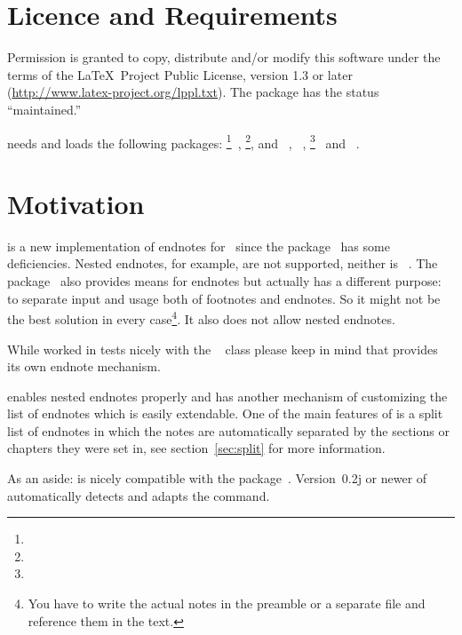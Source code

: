 \documentclass[toc=bib,toc=index]{cnpkgdoc}
\begin{document}
\section{Licence and Requirements}
Permission is granted to copy, distribute and/or modify this software under
the terms of the \LaTeX\ Project Public License, version 1.3 or later
(\url{http://www.latex-project.org/lppl.txt}).  The package has the status
``maintained.''

\enotez needs and loads the following packages:
\footnote{}~\cite{pkg:l3kernel},
\footnote{},  and
~\cite{pkg:l3packages}, ~\cite{pkg:xpatch},
\footnote{}~\cite{pkg:scrlfile} and
~\cite{pkg:translations}.


\section{Motivation}
\enotez is a new implementation of endnotes for \LaTeXe\ since the
 package~\cite{pkg:endnotes} has some deficiencies.  Nested
endnotes, for example, are not supported, neither is
~\cite{pkg:hyperref}.  The 
package~\cite{pkg:sepfootnotes} also provides means for endnotes but actually
has a different purpose: to separate input and usage both of footnotes and
endnotes.  So it might not be the best solution in every case\footnote{You
  have to write the actual notes in the preamble or a separate file and
  reference them in the text.}.  It also does not allow nested endnotes.

While \enotez worked in tests nicely with the
~\cite{cls:memoir} class please keep in mind that
 provides its own endnote mechanism.

\enotez enables nested endnotes properly and has another mechanism of
customizing the list of endnotes which is easily extendable.  One of the main
features of \enotez is a split list of endnotes in which the notes are
automatically separated by the sections or chapters they were set in, see
section~\ref{sec:split} for more information.

As an aside: \enotez is nicely compatible with the 
package~\cite{pkg:fnpct}.  Version~0.2j or newer of 
automatically detects \enotez and adapts the  command.
\end{document}
